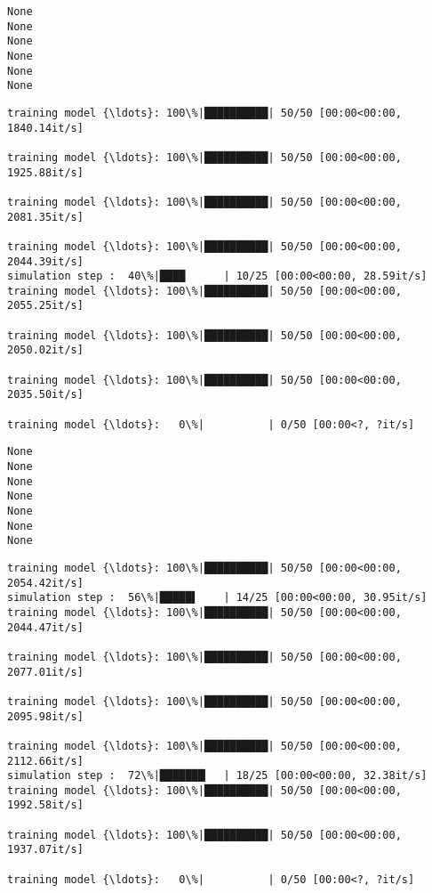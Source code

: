 \documentclass[11pt]{article}
\begin{document}
    \begin{Verbatim}[commandchars=\\\{\}]
None
None
None
None
None
None
    \end{Verbatim}

    \begin{Verbatim}[commandchars=\\\{\}]
training model {\ldots}: 100\%|██████████| 50/50 [00:00<00:00, 1840.14it/s]

training model {\ldots}: 100\%|██████████| 50/50 [00:00<00:00, 1925.88it/s]

training model {\ldots}: 100\%|██████████| 50/50 [00:00<00:00, 2081.35it/s]

training model {\ldots}: 100\%|██████████| 50/50 [00:00<00:00, 2044.39it/s]
simulation step :  40\%|████      | 10/25 [00:00<00:00, 28.59it/s]
training model {\ldots}: 100\%|██████████| 50/50 [00:00<00:00, 2055.25it/s]

training model {\ldots}: 100\%|██████████| 50/50 [00:00<00:00, 2050.02it/s]

training model {\ldots}: 100\%|██████████| 50/50 [00:00<00:00, 2035.50it/s]

training model {\ldots}:   0\%|          | 0/50 [00:00<?, ?it/s]
    \end{Verbatim}

    \begin{Verbatim}[commandchars=\\\{\}]
None
None
None
None
None
None
None
    \end{Verbatim}

    \begin{Verbatim}[commandchars=\\\{\}]
training model {\ldots}: 100\%|██████████| 50/50 [00:00<00:00, 2054.42it/s]
simulation step :  56\%|█████▌    | 14/25 [00:00<00:00, 30.95it/s]
training model {\ldots}: 100\%|██████████| 50/50 [00:00<00:00, 2044.47it/s]

training model {\ldots}: 100\%|██████████| 50/50 [00:00<00:00, 2077.01it/s]

training model {\ldots}: 100\%|██████████| 50/50 [00:00<00:00, 2095.98it/s]

training model {\ldots}: 100\%|██████████| 50/50 [00:00<00:00, 2112.66it/s]
simulation step :  72\%|███████▏  | 18/25 [00:00<00:00, 32.38it/s]
training model {\ldots}: 100\%|██████████| 50/50 [00:00<00:00, 1992.58it/s]

training model {\ldots}: 100\%|██████████| 50/50 [00:00<00:00, 1937.07it/s]

training model {\ldots}:   0\%|          | 0/50 [00:00<?, ?it/s]
    \end{Verbatim}
\end{document}
